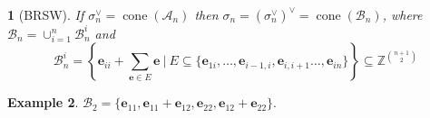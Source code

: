 \documentclass[mathserif
    , handout
   ]{beamer}
\newcommand{\vect}[1]{\mathbf#1}
\newcommand{\Z}{\mathbb Z}
\DeclareMathOperator{\cone}{cone}
\theoremstyle{plain}
\newtheorem{thm}{\color{white}{Theorem}}[subsection]
\theoremstyle{definition}
\newtheorem{ex}[thm]{Example}
\theoremstyle{remark}
\begin{document}
\begin{frame}
\begin{thm}[BRSW]
If $\sigma_n^{\vee}=\cone(\mathscr A_n)$ then $\sigma_n = (\sigma_n^{\vee})^{\vee} = \cone(\mathscr B_n)$, where $\mathscr B_n=\cup_{i=1}^n\mathscr B_n^i$ and 
\[
\mathscr B_n^i\!=\!\left\{\vect e_{ii} + \sum_{\vect e \in E} \vect e \ \bigg|\ E \subseteq \{\vect e_{1i},\ldots,\vect e_{i-1,i},\vect e_{i,i+1} \ldots,\vect e_{in}\}\right\}\subseteq \Z^{\binom{n+1}{2}}
\]
\end{thm}

\pause
\begin{ex}
$\mathscr B_2 = \{\vect e_{11},\vect e_{11}+\vect e_{12}, \vect e_{22}, \vect e_{12}+\vect e_{22}\}$.
\end{ex}
\end{frame}
\end{document}
